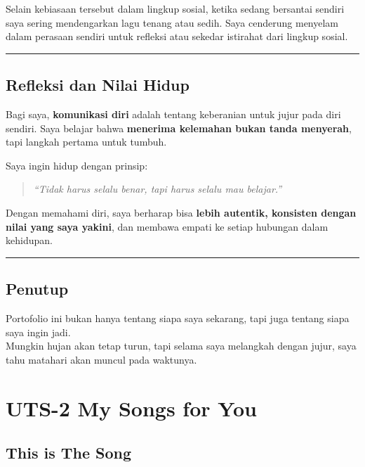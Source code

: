 \documentclass[
  letterpaper,
  DIV=11,
  numbers=noendperiod]{scrreprt}
\begin{document}
Selain kebiasaan tersebut dalam lingkup sosial, ketika sedang bersantai
sendiri saya sering mendengarkan lagu tenang atau sedih. Saya cenderung
menyelam dalam perasaan sendiri untuk refleksi atau sekedar istirahat
dari lingkup sosial.

\begin{center}\rule{0.5\linewidth}{0.5pt}\end{center}

\section{Refleksi dan Nilai Hidup}\label{refleksi-dan-nilai-hidup}

Bagi saya, \textbf{komunikasi diri} adalah tentang keberanian untuk
jujur pada diri sendiri. Saya belajar bahwa \textbf{menerima kelemahan
bukan tanda menyerah}, tapi langkah pertama untuk tumbuh.

Saya ingin hidup dengan prinsip:

\begin{quote}
\emph{``Tidak harus selalu benar, tapi harus selalu mau belajar.''}
\end{quote}

Dengan memahami diri, saya berharap bisa \textbf{lebih autentik,
konsisten dengan nilai yang saya yakini}, dan membawa empati ke setiap
hubungan dalam kehidupan.

\begin{center}\rule{0.5\linewidth}{0.5pt}\end{center}

\section{Penutup}\label{penutup}

Portofolio ini bukan hanya tentang siapa saya sekarang, tapi juga
tentang siapa saya ingin jadi.\\
Mungkin hujan akan tetap turun, tapi selama saya melangkah dengan jujur,
saya tahu matahari akan muncul pada waktunya.


\chapter{UTS-2 My Songs for You}\label{uts-2-my-songs-for-you}

\section{This is The Song}\label{this-is-the-song}
\end{document}

